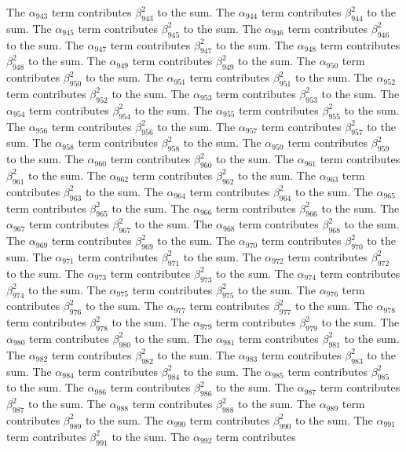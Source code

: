 \begin{lemma}
The $\alpha_{943}$ term contributes $\beta_{943}^{2}$ to the sum. The $\alpha_{944}$ term contributes $\beta_{944}^{2}$ to the sum. The $\alpha_{945}$ term contributes $\beta_{945}^{2}$ to the sum. The $\alpha_{946}$ term contributes $\beta_{946}^{2}$ to the sum. The $\alpha_{947}$ term contributes $\beta_{947}^{2}$ to the sum. The $\alpha_{948}$ term contributes $\beta_{948}^{2}$ to the sum. The $\alpha_{949}$ term contributes $\beta_{949}^{2}$ to the sum. The $\alpha_{950}$ term contributes $\beta_{950}^{2}$ to the sum. The $\alpha_{951}$ term contributes $\beta_{951}^{2}$ to the sum. The $\alpha_{952}$ term contributes $\beta_{952}^{2}$ to the sum. The $\alpha_{953}$ term contributes $\beta_{953}^{2}$ to the sum. The $\alpha_{954}$ term contributes $\beta_{954}^{2}$ to the sum. The $\alpha_{955}$ term contributes $\beta_{955}^{2}$ to the sum. The $\alpha_{956}$ term contributes $\beta_{956}^{2}$ to the sum. The $\alpha_{957}$ term contributes $\beta_{957}^{2}$ to the sum. The $\alpha_{958}$ term contributes $\beta_{958}^{2}$ to the sum. The $\alpha_{959}$ term contributes $\beta_{959}^{2}$ to the sum. The $\alpha_{960}$ term contributes $\beta_{960}^{2}$ to the sum. The $\alpha_{961}$ term contributes $\beta_{961}^{2}$ to the sum. The $\alpha_{962}$ term contributes $\beta_{962}^{2}$ to the sum. The $\alpha_{963}$ term contributes $\beta_{963}^{2}$ to the sum. The $\alpha_{964}$ term contributes $\beta_{964}^{2}$ to the sum. The $\alpha_{965}$ term contributes $\beta_{965}^{2}$ to the sum. The $\alpha_{966}$ term contributes $\beta_{966}^{2}$ to the sum. The $\alpha_{967}$ term contributes $\beta_{967}^{2}$ to the sum. The $\alpha_{968}$ term contributes $\beta_{968}^{2}$ to the sum. The $\alpha_{969}$ term contributes $\beta_{969}^{2}$ to the sum. The $\alpha_{970}$ term contributes $\beta_{970}^{2}$ to the sum. The $\alpha_{971}$ term contributes $\beta_{971}^{2}$ to the sum. The $\alpha_{972}$ term contributes $\beta_{972}^{2}$ to the sum. The $\alpha_{973}$ term contributes $\beta_{973}^{2}$ to the sum. The $\alpha_{974}$ term contributes $\beta_{974}^{2}$ to the sum. The $\alpha_{975}$ term contributes $\beta_{975}^{2}$ to the sum. The $\alpha_{976}$ term contributes $\beta_{976}^{2}$ to the sum. The $\alpha_{977}$ term contributes $\beta_{977}^{2}$ to the sum. The $\alpha_{978}$ term contributes $\beta_{978}^{2}$ to the sum. The $\alpha_{979}$ term contributes $\beta_{979}^{2}$ to the sum. The $\alpha_{980}$ term contributes $\beta_{980}^{2}$ to the sum. The $\alpha_{981}$ term contributes $\beta_{981}^{2}$ to the sum. The $\alpha_{982}$ term contributes $\beta_{982}^{2}$ to the sum. The $\alpha_{983}$ term contributes $\beta_{983}^{2}$ to the sum. The $\alpha_{984}$ term contributes $\beta_{984}^{2}$ to the sum. The $\alpha_{985}$ term contributes $\beta_{985}^{2}$ to the sum. The $\alpha_{986}$ term contributes $\beta_{986}^{2}$ to the sum. The $\alpha_{987}$ term contributes $\beta_{987}^{2}$ to the sum. The $\alpha_{988}$ term contributes $\beta_{988}^{2}$ to the sum. The $\alpha_{989}$ term contributes $\beta_{989}^{2}$ to the sum. The $\alpha_{990}$ term contributes $\beta_{990}^{2}$ to the sum. The $\alpha_{991}$ term contributes $\beta_{991}^{2}$ to the sum. The $\alpha_{992}$ term contributes 
\end{lemma}
